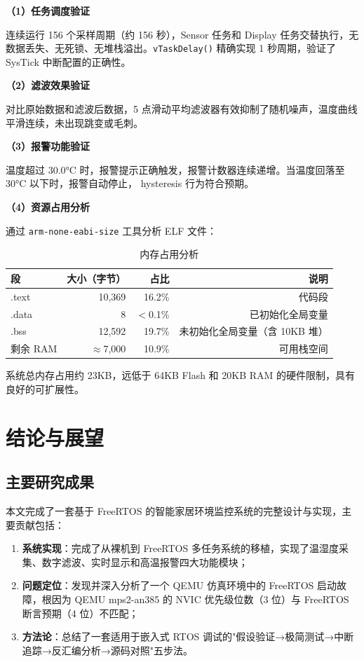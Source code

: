 \documentclass[12pt,a4paper]{ctexart}
\begin{document}
\textbf{（1）任务调度验证}

连续运行 156 个采样周期（约 156 秒），Sensor 任务和 Display 任务交替执行，无数据丢失、无死锁、无堆栈溢出。\texttt{vTaskDelay()} 精确实现 1 秒周期，验证了 SysTick 中断配置的正确性。

\textbf{（2）滤波效果验证}

对比原始数据和滤波后数据，5 点滑动平均滤波器有效抑制了随机噪声，温度曲线平滑连续，未出现跳变或毛刺。

\textbf{（3）报警功能验证}

温度超过 30.0°C 时，报警提示正确触发，报警计数器连续递增。当温度回落至 30°C 以下时，报警自动停止， hysteresis 行为符合预期。

\textbf{（4）资源占用分析}

通过 \texttt{arm-none-eabi-size} 工具分析 ELF 文件：

\begin{table}[H]
\centering
\caption{内存占用分析}
\label{tab:memory}
\begin{tabular}{lrrr}
\toprule
\textbf{段} & \textbf{大小（字节）} & \textbf{占比} & \textbf{说明} \\
\midrule
.text & 10,369 & 16.2\% & 代码段 \\
.data & 8 & $<$0.1\% & 已初始化全局变量 \\
.bss & 12,592 & 19.7\% & 未初始化全局变量（含 10KB 堆） \\
剩余 RAM & $\approx$7,000 & 10.9\% & 可用栈空间 \\
\bottomrule
\end{tabular}
\end{table}

系统总内存占用约 23KB，远低于 64KB Flash 和 20KB RAM 的硬件限制，具有良好的可扩展性。

\section{结论与展望}\label{sec:conclusion}

\subsection{主要研究成果}

本文完成了一套基于 FreeRTOS 的智能家居环境监控系统的完整设计与实现，主要贡献包括：

\begin{enumerate}[leftmargin=2em]
    \item \textbf{系统实现}：完成了从裸机到 FreeRTOS 多任务系统的移植，实现了温湿度采集、数字滤波、实时显示和高温报警四大功能模块；
    \item \textbf{问题定位}：发现并深入分析了一个 QEMU 仿真环境中的 FreeRTOS 启动故障，根因为 QEMU mps2-an385 的 NVIC 优先级位数（3 位）与 FreeRTOS 断言预期（4 位）不匹配；
    \item \textbf{方法论}：总结了一套适用于嵌入式 RTOS 调试的"假设验证→极简测试→中断追踪→反汇编分析→源码对照"五步法。
\end{enumerate}
\end{document}

